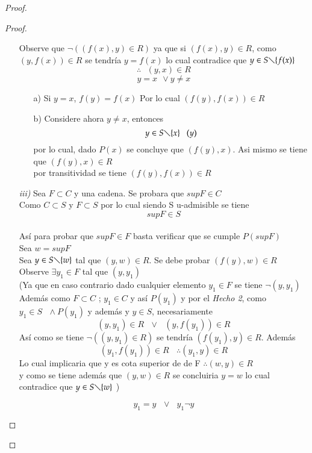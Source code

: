 \begin{proof}
\begin{proof}
\begin{itemize}
\newpage

Observe que $ \neg ((f(x),y) \in R)  $ ya que si $ (f(x),y) \in R $, como\\
 $ (y,f(x)) \in R $ se tendría $ y=f(x) $ lo cual contradice que $ y \in S \diagdown \lbrace f(x) \rbrace $ 
 $$\therefore \  \  \ (y,x) \in R $$
$$ y=x \ \ \vee y \neq x $$
\begin{itemize}
\item[a)] Si $ y=x $, $ f(y)=f(x)$ Por lo cual $(f(y),f(x)) \in R  $
\item[b)] Considere ahora $ y \neq x $, entonces $$ y \in S \diagdown \lbrace x \rbrace \ \ \ (y) $$
por lo cual, dado $ P(x) $ se concluye que $ (f(y), x) $. Asi mismo  se tiene que $ (f(y),x) \in R $ \\
por transitividad se tiene  $ (f(y),f(x)) \in R $
\end{itemize}
 \item[\textit{iii)}] Sea $ F \subset C $  y  una cadena. Se probara que $ supF \in C $ \\
 Como $ C \subset S $ y $ F \subset S $ por lo cual siendo S u-admisible se tiene\\
  $$  supF \in S $$ \\
 Así para probar que $ supF \in F $ basta verificar que se cumple $ P(supF) $\\
 Sea $  w = supF $ \\
 Sea $ y \in S \diagdown \lbrace w \rbrace $ tal que $ (y,w) \in R $. Se debe probar $ (f(y),w) \in R $
 Observe $ \exists y_{1} \in F $ tal que $ (y, y_{1}) $\\
 (Ya que en caso contrario dado cualquier elemento $ y_{1} \in F $ se tiene $ \neg (y,y_{1}) $ Además como $ F \subset C $ ; $ y_{1} \in C $  y así $ P(y_{1}) $ y por el \textit{Hecho 2}, como $ y_{1} \in S \ \ \ \wedge P(y_{1}) $ y además  y $ y \in S $, necesariamente 
 $$ (y,y_{1})\in R \ \ \ \vee \ \ \  (y,f(y_{1})) \in R $$ 
 Así como se tiene $ \neg ( (y,y_{1})\in R) $ se tendría $ (f(y_{1}),y) \in R $. Además $$ (y_{1},f(y_{1})) \in R \ \ \ \ \therefore (y_{1},y) \in R $$
 Lo cual implicaria  que y es cota superior de  de F $ \therefore (w,y) \in R $\\
 y como se tiene además que $ (y,w) \in R $ se concluiria  $ y=w $ lo  cual contradice que $ y \in S \diagdown \lbrace w \rbrace  $ )
 
$$ y_{1}  = y \ \ \ \vee \ \ \ y_{1} \neg y $$


\end{itemize}
\end{proof}
\end{proof}

